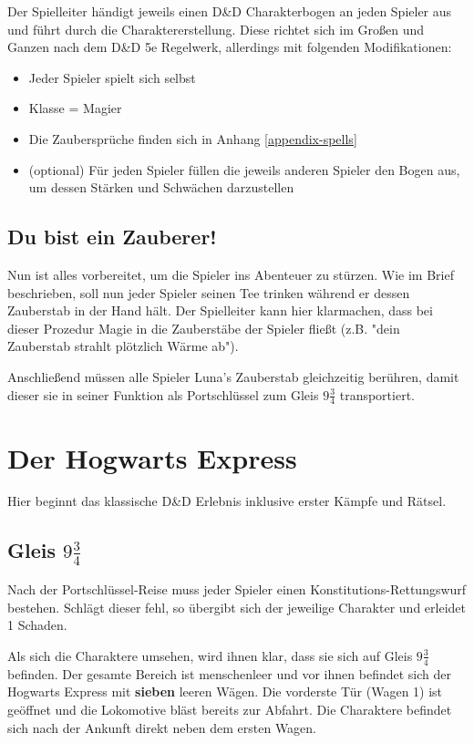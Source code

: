 \documentclass[]{scrartcl}
\begin{document}
Der Spielleiter händigt jeweils einen D\&D Charakterbogen an jeden Spieler aus und führt durch die Charaktererstellung. Diese richtet sich im Großen und Ganzen nach dem D\&D 5e Regelwerk, allerdings mit folgenden Modifikationen:
\begin{itemize}
	\item Jeder Spieler spielt sich selbst
	\item Klasse = Magier
	\item Die Zaubersprüche finden sich in Anhang \ref{appendix-spells}
	\item (optional) Für jeden Spieler füllen die jeweils anderen Spieler den Bogen aus, um dessen Stärken und Schwächen darzustellen
\end{itemize}

\subsection{Du bist ein Zauberer!}

Nun ist alles vorbereitet, um die Spieler ins Abenteuer zu stürzen. Wie im Brief beschrieben, soll nun jeder Spieler seinen Tee trinken während er dessen Zauberstab in der Hand hält. Der Spielleiter kann hier klarmachen, dass bei dieser Prozedur Magie in die Zauberstäbe der Spieler fließt (z.B. "dein Zauberstab strahlt plötzlich Wärme ab").

Anschließend müssen alle Spieler Luna's Zauberstab gleichzeitig berühren, damit dieser sie in seiner Funktion als Portschlüssel zum Gleis $9\frac{3}{4}$ transportiert.

\section{Der Hogwarts Express}

Hier beginnt das klassische D\&D Erlebnis inklusive erster Kämpfe und Rätsel.

\subsection{Gleis $9\frac{3}{4}$}

Nach der Portschlüssel-Reise muss jeder Spieler einen Konstitutions-Rettungswurf bestehen. Schlägt dieser fehl, so übergibt sich der jeweilige Charakter und erleidet 1 Schaden.

Als sich die Charaktere umsehen, wird ihnen klar, dass sie sich auf Gleis $9\frac{3}{4}$ befinden. Der gesamte Bereich ist menschenleer und vor ihnen befindet sich der Hogwarts Express mit {\bfseries sieben} leeren Wägen. Die vorderste Tür (Wagen 1) ist geöffnet und die Lokomotive bläst bereits zur Abfahrt. Die Charaktere befindet sich nach der Ankunft direkt neben dem ersten Wagen.
\end{document}
